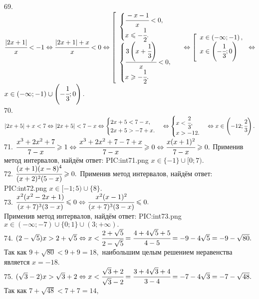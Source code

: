 69. $\cfrac{|2x+1|}{x}<-1\Leftrightarrow\cfrac{|2x+1|+x}{x}<0\Leftrightarrow
\left[\begin{array}{l}\begin{cases}\cfrac{-x-1}{x}<0,\\ x\leqslant-\cfrac{1}{2}.\end{cases}\\ \begin{cases}\cfrac{3\left(x+\cfrac{1}{3}\right)}{x}<0,\\ x\geqslant-\cfrac{1}{2}.\end{cases}  \end{array}\right.\Leftrightarrow\left[\begin{array}{l} x\in\left(-\infty;-1\right),\\
x\in\left(-\cfrac{1}{3};0\right)\end{array}\right.\Leftrightarrow$\\$ x\in\left(-\infty;-1\right)\cup\left(-\cfrac{1}{3};0\right).$\\
70. $|2x+5|+x<7\Leftrightarrow |2x+5|<7-x\Leftrightarrow \begin{cases}2x+5<7-x,\\ 2x+5>-7+x.\end{cases}
\Leftrightarrow \begin{cases}x<\cfrac{2}{3},\\ x>-12.\end{cases}\Leftrightarrow x\in\left(-12;\cfrac{2}{3}\right).$\\
71. $\cfrac{x^3+2x^2+7}{7-x}\geqslant1\Leftrightarrow\cfrac{x^3+2x^2+7-7+x}{7-x}\geqslant0\Leftrightarrow
\cfrac{x(x+1)^2}{7-x}\geqslant0.$ Применив метод интервалов, найдём ответ:
{{PIC:int71.png}}
$x\in\{-1\}\cup[0;7).$\\
72. $\cfrac{(x+1)(x-8)^4}{(x+2)^2(5-x)}\geqslant0.$ Применив метод интервалов, найдём ответ:
{{PIC:int72.png}}
$x\in[-1;5)\cup\{8\}.$\\
73. $\cfrac{x^2(x^2-2x+1)}{(x+7)^3(3-x)}\leqslant0\Leftrightarrow\cfrac{x^2(x-1)^2}{(x+7)^3(3-x)}\leqslant0.$\\ Применив метод интервалов, найдём ответ:
{{PIC:int73.png}}
$x\in(-\infty;-7)\cup\{0;1\}\cup(3;+\infty).$\\
74. $(2-\sqrt{5})x>2+\sqrt{5}\Leftrightarrow x<\cfrac{2+\sqrt{5}}{2-\sqrt{5}}=\cfrac{4+4\sqrt{5}+5}{4-5}=-9-4\sqrt{5}=-9-\sqrt{80}.$ Так как $9+\sqrt{80}<9+9=18,$
наибольшим целым решением неравенства является $x=-18.$\\
75. $(\sqrt{3}-2)x>\sqrt{3}+2\Leftrightarrow x<\cfrac{\sqrt{3}+2}{\sqrt{3}-2}=\cfrac{3+4\sqrt{3}+4}{3-4}=-7-4\sqrt{3}=-7-\sqrt{48}.$ Так как $7+\sqrt{48}<7+7=14,$
